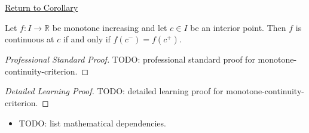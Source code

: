 \newpage
{}
\label{prf:monotone-continuity-criterion}

\begin{remark*}[Return]
\hyperref[cor:monotone-continuity-criterion]{Return to Corollary}
\end{remark*}

\begin{corollary*}
Let $f : I \to \mathbb{R}$ be monotone increasing and let $c \in I$ be an interior point. Then $f$ is continuous at $c$ if and only if $f(c^{-}) = f(c^{+})$.
\end{corollary*}

\begin{proof}[Professional Standard Proof]
\LRAProofBodyStart
TODO: professional standard proof for monotone-continuity-criterion.
\end{proof}

\begin{proof}[Detailed Learning Proof]
\LRAProofBodyStart
TODO: detailed learning proof for monotone-continuity-criterion.
\end{proof}

\begin{remark*}
\end{remark*}

\begin{dependencies}
\begin{itemize}
  \item TODO: list mathematical dependencies.
\end{itemize}
\end{dependencies}

\clearpage
